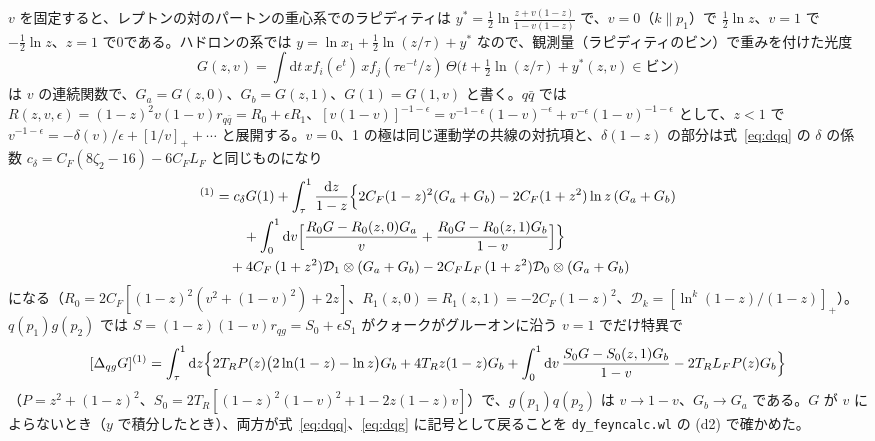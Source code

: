 \documentclass[a4paper,10pt]{ltjsarticle}
\newcommand{\dd}{\mathrm{d}}
\begin{document}
$v$ を固定すると、レプトンの対のパートンの重心系でのラピディティは $y^*=\frac12\ln\frac{z+v(1-z)}{1-v(1-z)}$ で、$v=0$（$k\parallel p_1$）で $\frac12\ln z$、$v=1$ で $-\frac12\ln z$、$z=1$ で0である。ハドロンの系では $y=\ln x_1+\frac12\ln(z/\tau)+y^*$ なので、観測量（ラピディティのビン）で重みを付けた光度
\[
G(z,v)=\int\dd t\,x f_i(e^t)\,x f_j(\tau e^{-t}/z)\,\Theta\bigl(t+\tfrac12\ln(z/\tau)+y^*(z,v)\in\text{ビン}\bigr)
\]
は $v$ の連続関数で、$G_a=G(z,0)$、$G_b=G(z,1)$、$G(1)=G(1,v)$ と書く。$q\bar q$ では $R(z,v,\epsilon)=(1-z)^2v(1-v)r_{q\bar q}=R_0+\epsilon R_1$、$[v(1-v)]^{-1-\epsilon}=v^{-1-\epsilon}(1-v)^{-\epsilon}+v^{-\epsilon}(1-v)^{-1-\epsilon}$ として、$z<1$ で $v^{-1-\epsilon}=-\delta(v)/\epsilon+[1/v]_++\cdots$ と展開する。$v=0$、1 の極は同じ運動学の共線の対抗項と、$\delta(1-z)$ の部分は式~\eqref{eq:dqq} の $\delta$ の係数 $c_\delta=C_F(8\zeta_2-16)-6C_FL_F$ と同じものになり
\begin{align*}
[\Delta_{q\bar q}G]^{(1)}&=c_\delta G(1)+\int_\tau^1\frac{\dd z}{1-z}\Bigl\{2C_F(1-z)^2(G_a+G_b)-2C_F(1+z^2)\ln z\,(G_a+G_b)\\
&\qquad+\int_0^1\dd v\Bigl[\frac{R_0G-R_0(z,0)G_a}v+\frac{R_0G-R_0(z,1)G_b}{1-v}\Bigr]\Bigr\}\\
&\quad+4C_F\,(1+z^2)\mathcal D_1\otimes(G_a+G_b)-2C_FL_F\,(1+z^2)\mathcal D_0\otimes(G_a+G_b)
\end{align*}
になる（$R_0=2C_F[(1-z)^2(v^2+(1-v)^2)+2z]$、$R_1(z,0)=R_1(z,1)=-2C_F(1-z)^2$、$\mathcal D_k=[\ln^k(1-z)/(1-z)]_+$）。$q(p_1)g(p_2)$ では $S=(1-z)(1-v)r_{qg}=S_0+\epsilon S_1$ がクォークがグルーオンに沿う $v=1$ でだけ特異で
\[
[\Delta_{qg}G]^{(1)}=\int_\tau^1\dd z\Bigl\{2T_RP(z)\bigl(2\ln(1-z)-\ln z\bigr)G_b+4T_Rz(1-z)G_b+\int_0^1\dd v\,\frac{S_0G-S_0(z,1)G_b}{1-v}-2T_RL_FP(z)G_b\Bigr\}
\]
（$P=z^2+(1-z)^2$、$S_0=2T_R[(1-z)^2(1-v)^2+1-2z(1-z)v]$）で、$g(p_1)q(p_2)$ は $v\to1-v$、$G_b\to G_a$ である。$G$ が $v$ によらないとき（$y$ で積分したとき）、両方が式~\eqref{eq:dqq}、\eqref{eq:dqg} に記号として戻ることを \texttt{dy\_feyncalc.wl} の (d2) で確かめた。
\end{document}
